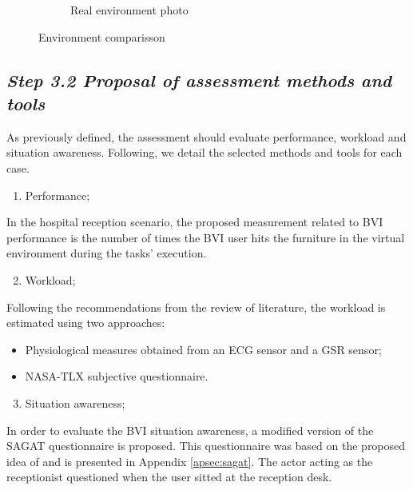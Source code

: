 \begin{figure}[!htb]
\begin{subfigure}[b]{0.49\textwidth}
                \caption{Real environment photo}
                \label{fig:re_photo}
            \end{subfigure}
               \caption{Environment comparisson}
               \label{fig:ve_re}
        \end{figure}

    \subsection*{\textit{Step 3.2 Proposal of assessment methods and tools}}

        As previously defined, the assessment should evaluate performance, workload and situation awareness. Following, we detail the selected methods and tools for each case.

        \begin{enumerate} [label = \Alph*)]
            \item Performance;
        \end{enumerate}
            
        In the hospital reception scenario, the proposed measurement related to BVI performance is the number of times the BVI user hits the furniture in the virtual environment during the tasks' execution.

        \begin{enumerate} [label = \Alph*)]
            \setcounter{enumi}{1}
            \item Workload;
        \end{enumerate}

        Following the recommendations from the review of literature, the workload is estimated using two approaches:
        \begin{itemize}
            \item Physiological measures obtained from an ECG sensor and a GSR sensor;
            \item NASA-TLX subjective questionnaire.           
        \end{itemize}

        \begin{enumerate} [label = \Alph*)]
            \setcounter{enumi}{2}
            \item Situation awareness;
        \end{enumerate}

        In order to evaluate the BVI situation awareness, a modified version of the SAGAT questionnaire is proposed. This questionnaire was based on the proposed idea of  and is presented in Appendix \ref{apsec:sagat}. The actor acting as the receptionist questioned when the user sitted at the reception desk.


